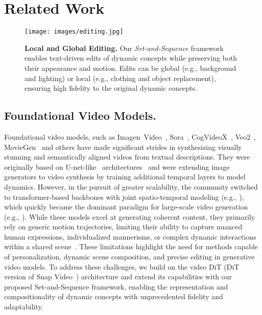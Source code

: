 \section{Related Work}
\begin{figure*}[t!]
        \centering
        
        \texttt{[image: images/editing.jpg]}
        \caption{\textbf{Local and Global Editing.} Our \textit{Set-and-Sequence} framework enables text-driven edits of dynamic concepts while preserving both their appearance and motion. Edits can be global (e.g., background and lighting) or local (e.g., clothing and object replacement), ensuring high fidelity to the original dynamic concepts.}
        \label{fig:editing}
    \end{figure*}




\subsection{Foundational Video Models.}

Foundational video models, such as Imagen~Video~\cite{ho2022imagen}, Sora~\cite{sora}, CogVideoX~\cite{yang2024cogvideox}, Veo2~\cite{Veo2}, MovieGen~\cite{polyak2024movie} and others have made significant strides in synthesizing visually stunning and semantically aligned videos from textual descriptions. They were originally based on U-net-like~\cite{U-net} architectures~\cite{hong2022cogvideo,singer2022make,guo2023animatediff,blattmann2023stable} and were extending image generators to video synthesis by training additional temporal layers to model dynamics. However, in the pursuit of greater scalability, the community switched to transformer-based backbones with joint spatio-temporal modeling (e.g., \cite{sora,RIN,menapace2024snap}), which quickly became the dominant paradigm for large-scale video generation (e.g., \cite{polyak2024movie,sora,HunyuanVideo,yang2024cogvideox}). While these models excel at generating coherent content, they primarily rely on generic motion trajectories, limiting their ability to capture nuanced human expressions, individualized mannerisms, or complex dynamic interactions within a shared scene~\cite{sora,menapace2024snap}.
These limitations highlight the need for methods capable of personalization, dynamic scene composition, and precise editing in generative video models.
To address these challenges, we build on the video DiT (DiT version of Snap Video~\cite{menapace2024snap}) architecture and extend its capabilities with our proposed Set-and-Sequence framework, enabling the representation and compositionality of dynamic concepts with unprecedented fidelity and adaptability.







